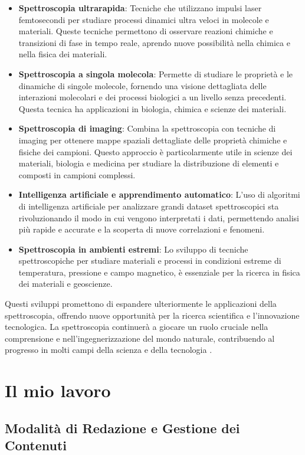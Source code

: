 \documentclass[12pt,a4paper]{report}
\begin{document}
\begin{itemize}
\item \textbf{Spettroscopia ultrarapida}: Tecniche che utilizzano impulsi laser femtosecondi per studiare processi dinamici ultra veloci in molecole e materiali. Queste tecniche permettono di osservare reazioni chimiche e transizioni di fase in tempo reale, aprendo nuove possibilità nella chimica e nella fisica dei materiali.
\item \textbf{Spettroscopia a singola molecola}: Permette di studiare le proprietà e le dinamiche di singole molecole, fornendo una visione dettagliata delle interazioni molecolari e dei processi biologici a un livello senza precedenti. Questa tecnica ha applicazioni in biologia, chimica e scienze dei materiali.
\item \textbf{Spettroscopia di imaging}: Combina la spettroscopia con tecniche di imaging per ottenere mappe spaziali dettagliate delle proprietà chimiche e fisiche dei campioni. Questo approccio è particolarmente utile in scienze dei materiali, biologia e medicina per studiare la distribuzione di elementi e composti in campioni complessi.
\item \textbf{Intelligenza artificiale e apprendimento automatico}: L'uso di algoritmi di intelligenza artificiale per analizzare grandi dataset spettroscopici sta rivoluzionando il modo in cui vengono interpretati i dati, permettendo analisi più rapide e accurate e la scoperta di nuove correlazioni e fenomeni.
\item \textbf{Spettroscopia in ambienti estremi}: Lo sviluppo di tecniche spettroscopiche per studiare materiali e processi in condizioni estreme di temperatura, pressione e campo magnetico, è essenziale per la ricerca in fisica dei materiali e geoscienze.
\end{itemize}

Questi sviluppi promettono di espandere ulteriormente le applicazioni della spettroscopia, offrendo nuove opportunità per la ricerca scientifica e l'innovazione tecnologica. La spettroscopia continuerà a giocare un ruolo cruciale nella comprensione e nell'ingegnerizzazione del mondo naturale, contribuendo al progresso in molti campi della scienza e della tecnologia \cite{johnson2020future}.

\chapter{Il mio lavoro}
\section{Modalità di Redazione e Gestione dei Contenuti}
\end{document}
